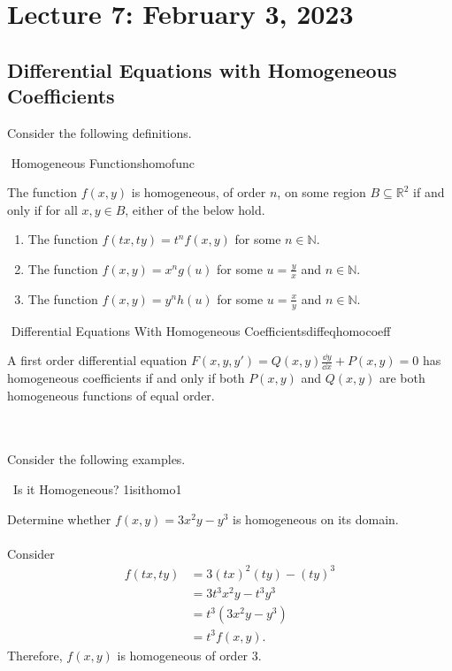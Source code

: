     \pagebreak

\section{Lecture 7: February 3, 2023}

\subsection{Differential Equations with Homogeneous Coefficients}

    Consider the following definitions.
    \begin{definition}{\Stop\,\,Homogeneous Functions}{homofunc}

        The function \(f(x,y)\) is homogeneous, of order \(n\), on some region \(B\subseteq\mathbb{R}^2\) if and only if for all \(x,y\in B\), either of the below hold.
        \begin{enumerate}
            \item The function \(f(tx,ty)=t^nf(x,y)\) for some \(n\in\mathbb{N}\).
            \item The function \(f(x,y)=x^ng(u)\) for some \(u=\frac{y}{x}\) and \(n\in\mathbb{N}\).
            \item The function \(f(x,y)=y^nh(u)\) for some \(u=\frac{x}{y}\) and \(n\in\mathbb{N}\).
        \end{enumerate}

    \end{definition}
    \begin{definition}{\Stop\,\,Differential Equations With Homogeneous Coefficients}{diffeqhomocoeff}

        A first order differential equation \(F(x,y,y')=Q(x,y)\frac{\dd y}{\dd x}+P(x,y)=0\) has homogeneous coefficients if and only if both \(P(x,y)\) and \(Q(x,y)\) are both homogeneous functions of equal order.
        
    \end{definition}
    \vphantom
    \\
    \\
    Consider the following examples.
    \begin{example}{\Difficulty\,\Difficulty\,\,Is it Homogeneous? 1}{isithomo1}

        Determine whether \(f(x,y)=3x^2y-y^3\) is homogeneous on its domain.
        \\
        \\
        Consider
        \begin{align*}
            f(tx,ty)&=3(tx)^2(ty)-(ty)^3 \\
            &=3t^3x^2y-t^3y^3 \\
            &=t^3(3x^2y-y^3) \\
            &=t^3f(x,y).
        \end{align*}
        Therefore, \(f(x,y)\) is homogeneous of order \(3\).

    \end{example}
